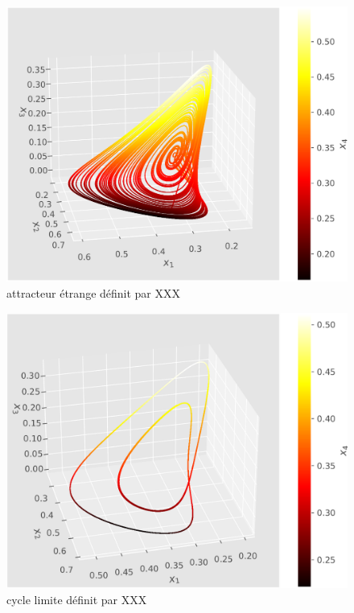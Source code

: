 \documentclass{wsdcr}
\begin{document}
\begin{figure}
    \centering
    \includegraphics[width=\linewidth]{fig/lv4_ae4.png}
    \caption{attracteur étrange définit par XXX}
    \label{fig:ae4}
\end{figure}
\begin{figure}
    \centering
    \includegraphics[width=\linewidth]{fig/lv4_cl4.png}
    \caption{cycle limite définit par XXX}
    \label{fig:cl4}
\end{figure}
\end{document}
